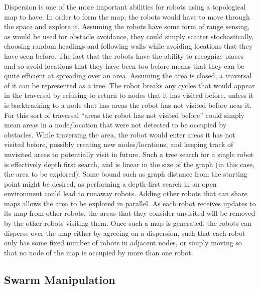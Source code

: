 Dispersion is one of the more important abilities for robots using a topological map to have. 
In order to form the map, the robots would have to move through the space and explore it. 
Assuming the robots have some form of range sensing, as would be used for obstacle avoidance, they could simply scatter stochastically, choosing random headings and following walls while avoiding locations that they have seen before. 
The fact that the robots have the ability to recognize places and so avoid locations that they have been too before means that they can be quite efficient at spreading over an area. 
Assuming the area is closed, a traversal of it can be represented as a tree. 
The robot breaks any cycles that would appear in the traversal by refusing to return to nodes that it has visited before, unless it is backtracking to a node that has areas the robot has not visited before near it. 
For this sort of traversal ``areas the robot has not visited before'' could simply mean areas in a node/location that were not detected to be occupied by obstacles. 
While traversing the area, the robot would enter areas it has not visited before, possibly creating new nodes/locations, and keeping track of unvisited areas to potentially visit in future. 
Such a tree search for a single robot is effectively depth first search, and is linear in the size of the graph (in this case, the area to be explored).
Some bound such as graph distance from the starting point might be desired, as performing a depth-first search in an open environment could lead to runaway robots. 
Adding other robots that can share maps allows the area to be explored in parallel. 
As each robot receives updates to its map from other robots, the areas that they consider unvisited will be removed by the other robots visiting them. 
Once such a map is generated, the robots can disperse over the map either by agreeing on a dispersion, such that each robot only has some fixed number of robots in adjacent nodes, or simply moving so that no node of the map is occupied by more than one robot. 

\subsection{Swarm Manipulation}

